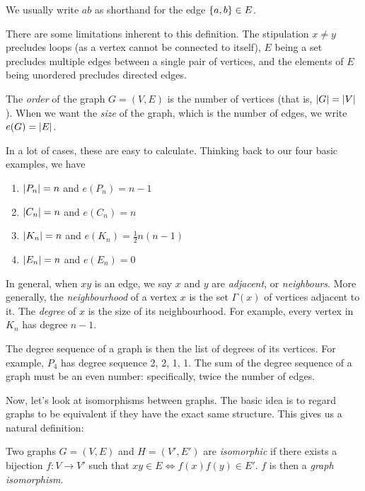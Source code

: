 \documentclass{article}
\begin{document}
\begin{note}
	We usually write $ab$ as shorthand for the edge $\left\lbrace a, b \right\rbrace \in E$.
\end{note}

\begin{note}
	There are some limitations inherent to this definition. The stipulation $x \neq y$ precludes loops (as a vertex cannot be connected to itself), $E$ being a set precludes multiple edges between a single pair of vertices, and the elements of $E$ being unordered precludes directed edges.
\end{note}

\begin{definition}
    The \textit{order} of the graph $G = (V, E)$ is the number of vertices (that is, $\left\lvert G \right\rvert = \left\lvert V \right\rvert$). When we want the \textit{size} of the graph, which is the number of edges, we write $e(G) = \left\lvert E \right\rvert$.
\end{definition}

In a lot of cases, these are easy to calculate. Thinking back to our four basic examples, we have
\begin{enumerate}
    \item $\left\lvert P_n \right\rvert = n$ and  $e(P_n) = n-1$
    \item $\left\lvert C_n \right\rvert = n$ and  $e(C_n) = n$
    \item $\left\lvert K_n \right\rvert = n$ and  $e(K_n) = \frac{1}{2}n(n-1)$
    \item $\left\lvert E_n \right\rvert = n$ and  $e(E_n) = 0$
\end{enumerate}

In general, when $xy$ is an edge, we say $x$ and $y$ are \textit{adjacent}, or \textit{neighbours}. More generally, the \textit{neighbourhood} of a vertex $x$ is the set $\Gamma (x)$ of vertices adjacent to it. The \textit{degree} of $x$ is the size of its neighbourhood. For example, every vertex in $K_n$ has degree $n-1$.

\begin{note}
	The degree sequence of a graph is then the list of degrees of its vertices. For example, $P_4$ has degree sequence 2, 2, 1, 1. The sum of the degree sequence of a graph must be an even number: specifically, twice the number of edges.
\end{note}

Now, let's look at isomorphisms between graphs. The basic idea is to regard graphs to be equivalent if they have the exact same structure. This gives us a natural definition:

\begin{definition}
    Two graphs $G = (V, E)$ and $H = (V', E')$ are \textit{isomorphic} if there exists a bijection $f: V \to V'$ such that $xy \in E \iff f(x)f(y) \in E'$. $f$ is then a \textit{graph isomorphism}.
\end{definition}
\end{document}
